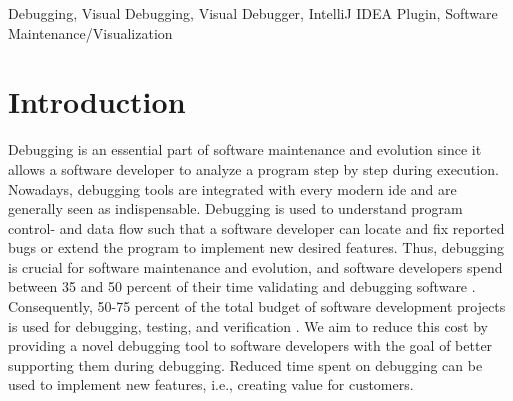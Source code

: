\documentclass[conference]{IEEEtran}
\newcommand{\intellij}{IntelliJ IDEA}
\begin{document}
\begin{abstract}
\emph{Debugging} is an important activity in software development to understand control- and data flow in the source code.
Understanding the source code is a prerequisite to finding and fixing bugs or implementing new desired features. 
Traditionally information during program runtime is visualized in a textual manner while debugging.
However, we have developed a novel tool for visualizing program information as object diagrams, which is integrated as a plugin into the popular Java development environment \intellij{}.
\end{abstract}

\begin{IEEEkeywords}
Debugging, Visual Debugging, Visual Debugger, IntelliJ IDEA Plugin, Software Maintenance/Visualization
\end{IEEEkeywords}

\section{Introduction}
Debugging is an essential part of software maintenance and evolution since it allows a software developer to analyze a program step by step during execution.
Nowadays, debugging tools are integrated with every modern \gls*{ide} and are generally seen as indispensable.
Debugging is used to understand program control- and data flow such that a software developer can locate and fix reported bugs or extend the program to implement new desired features.
Thus, debugging is crucial for software maintenance and evolution, and software developers spend between 35 and 50 percent of their time validating and debugging software \cite{odellDebuggingMindsetUnderstanding2017}.
Consequently, 50-75 percent of the total budget of software development projects is used for debugging, testing, and verification \cite{odellDebuggingMindsetUnderstanding2017}.
We aim to reduce this cost by providing a novel debugging tool to software developers with the goal of better supporting them during debugging.
Reduced time spent on debugging can be used to implement new features, i.e., creating value for customers.
\end{document}
